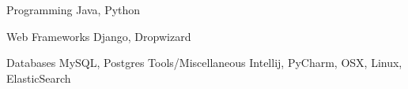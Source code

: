 

\begin{cvskills}

  \cvskill
    {Programming} %
    {Java, Python} %

  \cvskill
    {Web Frameworks} %
    {Django, Dropwizard} %

  \cvskill
    {Databases} %
    {MySQL, Postgres} %
  \cvskill
    {Tools/Miscellaneous} %
    {Intellij, PyCharm, OSX, Linux, ElasticSearch} %

\end{cvskills}
